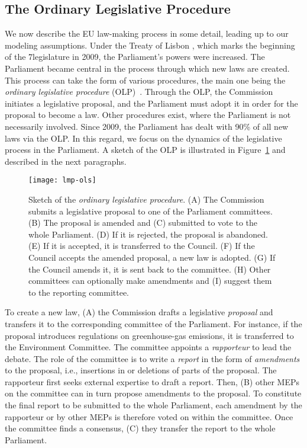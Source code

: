 \subsection{The Ordinary Legislative Procedure}

We now describe the EU law-making process in some detail, leading up to our modeling assumptions.
Under the Treaty of Lisbon \cite{eu2007lisbon}, which marks the beginning of the 7\th legislature in 2009, the Parliament's powers were increased.
The Parliament became central in the process through which new laws are created.
This process can take the form of various procedures, the main one being the \textit{ordinary legislative procedure} (OLP)~\cite{europarl2018ordinary}.
Through the OLP, the Commission initiates a legislative proposal, and the Parliament must adopt it in order for the proposal to become a law.
Other procedures exist, where the Parliament is not necessarily involved.
Since 2009, the Parliament has dealt with 90\% of all new laws via the OLP.
In this regard, we focus on the dynamics of the legislative process in the Parliament.
A sketch of the OLP is illustrated in Figure~\ref{fig:ols} and described in the next paragraphs.

\begin{figure}
  \centering
	\texttt{[image: lmp-ols]}
	\caption{
		Sketch of the \textit{ordinary legislative procedure}.
		(A) The Commission submits a legislative proposal to one of the Parliament committees.
		(B) The proposal is amended and (C) submitted to vote to the whole Parliament.
		(D) If it is rejected, the proposal is abandoned.
		(E) If it is accepted, it is transferred to the Council.
		(F) If the Council accepts the amended proposal, a new law is adopted.
		(G) If the Council amends it, it is sent back to the committee.
		(H) Other committees can optionally make amendments and (I) suggest them to the reporting committee.
	}
	\label{fig:ols}
\end{figure}

To create a new law, (A) the Commission drafts a legislative \textit{proposal} and transfers it to the corresponding committee of the Parliament.
For instance, if the proposal introduces regulations on greenhouse-gas emissions, it is transferred to the Environment Committee.
The committee appoints a \textit{rapporteur} to lead the debate.
The role of the committee is to write a \textit{report} in the form of \textit{amendments} to the proposal, i.e., insertions in or deletions of parts of the proposal.
The rapporteur first seeks external expertise to draft a report.
Then, (B) other MEPs on the committee can in turn propose amendments to the proposal.
To constitute the final report to be submitted to the whole Parliament, each amendment by the rapporteur or by other MEPs is therefore voted on within the committee.
Once the committee finds a consensus, (C) they transfer the report to the whole Parliament.

